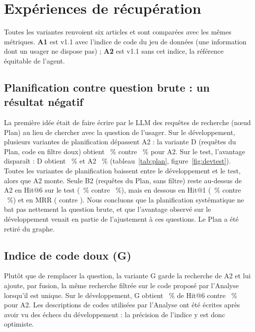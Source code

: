 \section{Expériences de récupération}\label{sec:recup}

Toutes les variantes renvoient six articles et sont comparées avec les mêmes métriques. \textbf{A1} est v1.1 avec l'indice
de code du jeu de données (une information dont un usager ne dispose pas) ; \textbf{A2} est v1.1 sans cet indice, la référence
équitable de l'agent.

\subsection{Planification contre question brute : un résultat négatif}
La première idée était de faire écrire par le LLM des requêtes de recherche (nœud Plan) au lieu de chercher avec la question
de l'usager. Sur le développement, plusieurs variantes de planification dépassent A2 : la variante D (requêtes du Plan,
code en filtre doux) obtient \NPvrDevDHitsix~\% contre \NPvrDevATwoHitsix~\% pour A2. Sur le test, l'avantage disparaît :
D obtient \NPvrTestDHitsix~\% et A2 \NPvrTestATwoHitsix~\% (tableau~\ref{tab:plan}, figure~\ref{fig:devtest}). Toutes les
variantes de planification baissent entre le développement et le test, alors que A2 monte. Seule B2 (requêtes du Plan, sans
filtre) reste au-dessus de A2 en Hit@6 sur le test (\NPvrTestBTwoHitsix~\% contre \NPvrTestATwoHitsix~\%), mais en dessous en
Hit@1 (\NPvrTestBTwoHitone~\% contre \NPvrTestATwoHitone~\%) et en MRR (\NPvrTestBTwoMrr{} contre \NPvrTestATwoMrr). Nous
concluons que la planification systématique ne bat pas nettement la question brute, et que l'avantage observé sur le
développement venait en partie de l'ajustement à ces \NQDev{} questions. Le Plan a été retiré du graphe.



\subsection{Indice de code doux (G)}
Plutôt que de remplacer la question, la variante G garde la recherche de A2 et lui ajoute, par fusion, la même recherche
filtrée sur le code proposé par l'Analyse lorsqu'il est unique. Sur le développement, G obtient \NLoopGHitsix~\% de Hit@6
contre \NLoopAtwoHitsix~\% pour A2. Les descriptions de codes utilisées par l'Analyse ont été écrites après avoir vu des
échecs du développement : la précision de l'indice y est donc optimiste.

